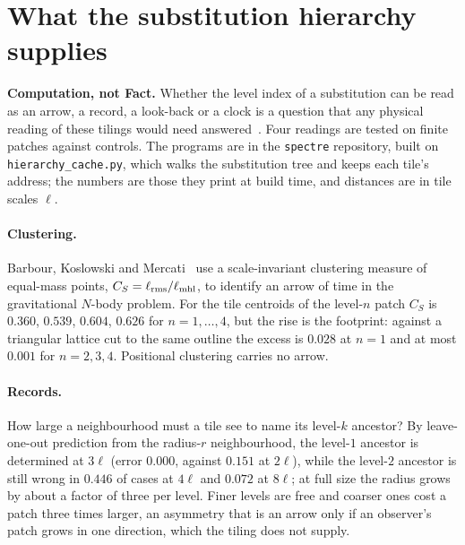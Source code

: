 \documentclass[11pt]{article}
\theoremstyle{definition}
\theoremstyle{remark}
\newcommand{\code}[1]{\texttt{#1}}
\begin{document}
\section{What the substitution hierarchy supplies}
\label{sec:hier}

\textbf{Computation, not Fact.}  Whether the level index of a substitution can be read as an arrow, a record, a look-back
or a clock is a question that any physical reading of these tilings would need answered~\cite{BangNote}.  Four readings are tested on finite patches against controls.  The programs are in the \code{spectre}
repository, built on \code{hierarchy\_cache.py}, which walks the substitution tree and keeps each tile's address; the
numbers are those they print at build time, and distances are in tile scales $\ell$.

\paragraph{Clustering.}  Barbour, Koslowski and Mercati~\cite{BKM} use a scale-invariant clustering measure of equal-mass
points, $C_S=\ell_{\rm rms}/\ell_{\rm mhl}$, to identify an arrow of time in the gravitational $N$-body problem.  For the tile
centroids of the level-$n$ patch $C_S$ is $0.360$, $0.539$, $0.604$, $0.626$ for $n=1,\dots,4$, but the rise is the footprint: against a
triangular lattice cut to the same outline the excess is $0.028$ at $n=1$ and at most $0.001$ for $n=2,3,4$.  Positional clustering
carries no arrow.

\paragraph{Records.}  How large a neighbourhood must a tile see to name its level-$k$ ancestor?  By leave-one-out
prediction from the radius-$r$ neighbourhood, the level-$1$ ancestor is determined at $3\ell$ (error $0.000$, against $0.151$ at
$2\ell$), while the level-$2$ ancestor is still wrong in $0.446$ of cases at $4\ell$ and $0.072$ at $8\ell$; at full size the
radius grows by about a factor of three per level.  Finer levels are free and coarser ones cost a patch three times larger,
an asymmetry that is an arrow only if an observer's patch grows in one direction, which the tiling does not supply.
\end{document}
